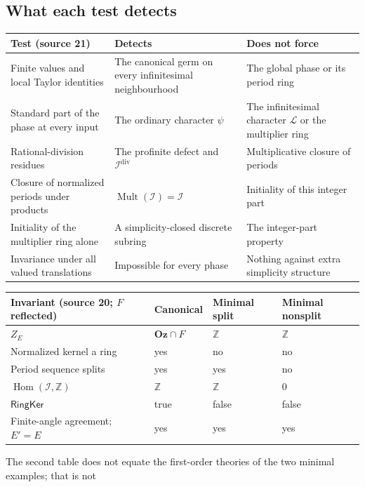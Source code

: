 \documentclass[11pt,letterpaper]{article}
\numberwithin{equation}{section}
\theoremstyle{definition}
\theoremstyle{remark}
\newcommand{\Oz}{\mathbf{Oz}}
\newcommand{\Z}{\mathbb Z}
\newcommand{\Hom}{\operatorname{Hom}}
\newcommand{\Mult}{\operatorname{Mult}}
\newcommand{\cI}{\mathcal I}
\newcommand{\cL}{\mathcal L}
\begin{document}
\subsection{What each test detects}\label{trigonometry:per:sec:tests}
\begin{center}\small
\begin{tabular}{L{0.26\textwidth}L{0.30\textwidth}L{0.34\textwidth}}
\toprule
Test (source 21) & Detects & Does not force\\
\midrule
Finite values and local Taylor identities & The canonical germ on every infinitesimal neighbourhood & The global phase or its period ring\\
Standard part of the phase at every input & The ordinary character $\psi$ & The infinitesimal character $\cL$ or the multiplier ring\\
Rational-division residues & The profinite defect and $\cI^{\mathrm{div}}$ & Multiplicative closure of periods\\
Closure of normalized periods under products & $\Mult(\cI)=\cI$ & Initiality of this integer part\\
Initiality of the multiplier ring alone & A simplicity-closed discrete subring & The integer-part property\\
Invariance under all valued translations & Impossible for every phase & Nothing against extra simplicity structure\\
\bottomrule
\end{tabular}
\end{center}
\begin{center}\small
\begin{tabular}{L{0.30\textwidth}L{0.17\textwidth}L{0.17\textwidth}L{0.19\textwidth}}
\toprule
Invariant (source 20; $F$ reflected) & Canonical & Minimal split & Minimal nonsplit\\
\midrule
$Z_E$ & $\Oz\cap F$ & $\Z$ & $\Z$\\
Normalized kernel a ring & yes & no & no\\
Period sequence splits & yes & yes & no\\
$\Hom(\cI,\Z)$ & $\Z$ & $\Z$ & $0$\\
$\mathsf{RingKer}$ & true & false & false\\
Finite-angle agreement; $E'=E$ & yes & yes & yes\\
\bottomrule
\end{tabular}
\end{center}
The second table does not equate the first-order theories of the two minimal examples; that is not
\end{document}

